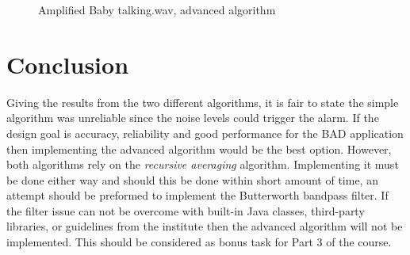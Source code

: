 \begin{figure}[H]
  \centering
  \caption{Amplified Baby talking.wav, advanced algorithm}
  \label{fig:bt_advn_amped}
\end{figure}

\section{Conclusion}
Giving the results from the two different algorithms, it is fair to state the
simple algorithm was unreliable since the noise levels could trigger the alarm.
If the design goal is accuracy, reliability and good performance for the BAD
application then implementing the advanced algorithm would be the best option.
However, both algorithms rely on the \emph{recursive averaging} algorithm.
Implementing it must be done either way and should this be done within short
amount of time, an attempt should be preformed to implement the Butterworth
bandpass filter. If the filter issue can not be overcome with built-in Java
classes, third-party libraries, or guidelines from the institute then the
advanced algorithm will not be implemented. This should be considered as bonus
task for Part 3 of the course.
